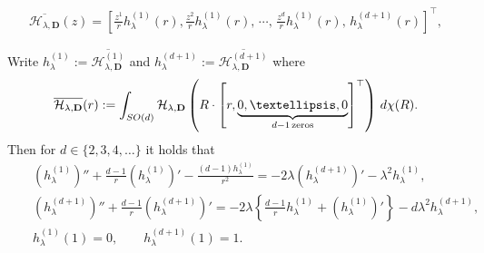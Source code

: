 \documentclass[10pt,a4paper]{amsart}
\newcommand{\dd}{{\rm d}}
\begin{document}
\begin{align}\label{new, B}
    \overline{\mathcal{H}_{\lambda, \mathbf{D}}}(z)  = \left[
\frac{z^{1}}{r}h_{ \lambda}^{(1)}(r),\frac{z^{2}}{r}h_{ \lambda}^{(1)}(r),\, \cdots ,\,\frac{z^{d}}{r}h_{ \lambda}^{(1)}(r),\, h^{(d+1)}_{\lambda}(r) \right]^\top,
\end{align}

\begin{proposition}\label{propn: ODE for hyperbolic dev in d-dim}
Write $h_{\lambda}^{(1)}:=\overline{\mathcal{H}^{(1)}_{\lambda, \mathbf{D}}}$ and $h_{\lambda}^{(d+1)}:=\overline{\mathcal{H}^{(d+1)}_{\lambda, \mathbf{D}}}$ where 
\begin{equation*}
    \overline{\mathcal{H}_{\lambda, \mathbf{D}}}(r) := \int_{SO(d)} \mathcal{H}_{\lambda, \mathbf{D}}\left(R\cdot\left[r,\underbrace{0,\ldots,0}_{d-1\,\text{zeros}}\right]^\top\right) \,\dd\chi(R).
\end{equation*}
Then for $d\in \{2,3,4,\ldots\}$ it holds that
  \begin{eqnarray}
    &&\left(h^{(1)}_{\lambda} \right)'' + \frac{d-1}{r} \left(h^{(1)}_{\lambda}\right)'- \frac{(d-1) h^{(1)}_{\lambda}}{r^2} = -2\lambda \left(h^{(d+1)}_{\lambda}\right)' - \lambda^{2}h^{(1)}_{\lambda},\label{ODE one, d-dim}\\
    && \left(h^{(d+1)}_{\lambda}\right)'' +\frac{d-1}{r}\left(h^{(d+1)}_{\lambda}\right)' = - 2 \lambda \left\{\frac{d-1}{r}h^{(1)}_{\lambda} +\left(h^{(1)}_{\lambda}\right)'\right\} -  d \lambda^{2}h^{(d+1)}_{\lambda},\label{ODE two, d-dim}\\
    && h^{(1)}_\lambda (1) = 0,\qquad h^{(d+1)}_\lambda(1)=1.
    \end{eqnarray}
\end{proposition}
\end{document}
